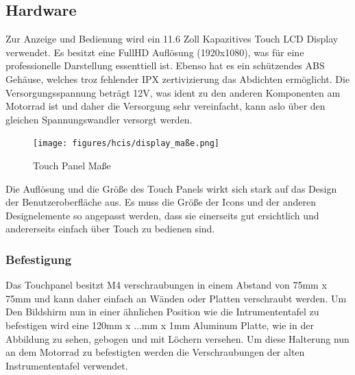 \subsection{Hardware}

Zur Anzeige und Bedienung wird ein 11.6 Zoll Kapazitives Touch LCD Display verwendet. Es besitzt eine FullHD Auflösung (1920x1080), was für eine professionelle Darstellung essenttiell ist. Ebenso hat es ein schützendes ABS Gehäuse, welches troz fehlender IPX zertivizierung das Abdichten ermöglicht. Die Versorgungsspannung beträgt 12V, was ident zu den anderen Komponenten am Motorrad ist und daher die Versorgung sehr vereinfacht, kann aslo über den gleichen Spannungswandler versorgt werden.

\begin{figure}[H]
	\begin{center}
		\texttt{[image: figures/hcis/display\_maße.png]}
		\caption{Touch Panel Maße}
		\label{fig:panel}
	\end{center}
\end{figure}

Die Auflösung und die Größe des Touch Panels wirkt sich stark auf das Design der Benutzeroberfläche aus. Es muss die Größe der Icons und der anderen Designelemente so angepasst werden, dass sie einerseits gut ersichtlich und andererseits einfach über Touch zu bedienen sind. 

\newpage

\subsubsection{Befestigung}
Das Touchpanel besitzt M4 verschraubungen in einem Abstand von 75mm x 75mm und kann daher einfach an Wänden oder Platten verschraubt werden. Um Den Bildshirm nun in einer ähnlichen Position wie die Intrumententafel zu befestigen wird eine 120mm x ...mm x 1mm Aluminum Platte, wie in der Abbildung zu sehen, gebogen und mit Löchern versehen. Um diese Halterung nun an dem Motorrad zu befestigten werden die Verschraubungen der alten Instrumententafel verwendet.

